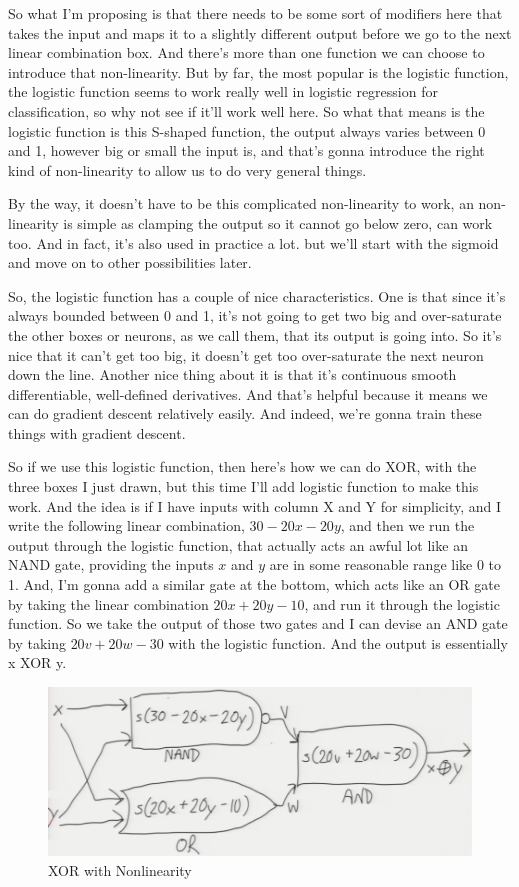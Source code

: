 \documentclass[fleqn,10pt]{olplainarticle}
\theoremstyle{definition}
\theoremstyle{remark}
\begin{document}
So what I'm proposing is that there needs to be some sort of modifiers here that takes the input and maps it to a slightly different output before we go to the next linear combination box. And there's more than one function we can choose  to introduce that non-linearity. But by far, the most popular is the logistic function, the logistic function seems to work really well in logistic regression for classification, so why not see if it'll work well here. So what that means is the logistic function is this S-shaped function, the output always varies between 0 and 1, however big or small the input is, and that's gonna introduce the right kind of non-linearity to allow us to do very general things. 

By the way, it doesn't have to be this complicated non-linearity to work, an non-linearity is simple as clamping the output so it cannot go below zero, can work too. And in fact, it's also used in practice a lot. but we'll start with the sigmoid and move on to other possibilities later.

So, the logistic function has a couple of nice characteristics. One is that since it's always bounded between 0 and 1, it's not going to get two big and over-saturate the other boxes or neurons, as we call them, that its output is going into. So it's nice that it can't get too big, it doesn't get too over-saturate the next neuron down the line. Another nice thing about it is that it's continuous smooth differentiable, well-defined derivatives. And that's helpful because it means we can do gradient descent relatively easily. And indeed, we're gonna train these things with gradient descent. 

So if we use this logistic function, then here's how we can do XOR, with the three boxes I just drawn, but this time I'll add logistic function to make this work. And the idea is if I have inputs with column X and Y for simplicity, and I write the following linear combination, $30-20x-20y$, and then we run the output through the logistic function, that actually acts an awful lot like an NAND gate, providing the inputs $x$ and $y$ are in some reasonable range like 0 to 1. And, I'm gonna add a similar gate at the bottom, which acts like an OR gate by taking the linear combination $20x+20y-10$, and run it through the logistic function. So we take the output of those two gates and I can devise an AND gate by taking $20v+20w-30$ with the logistic function. And the output is essentially x XOR y. 
\begin{figure}[ht]
\centering
\includegraphics[width=0.75\linewidth]{images/linear_combo_boxes_nonlinear_xor}
\caption{XOR with Nonlinearity}
\label{fig:linear_combo_boxes_nonlinear_xor}
\end{figure}
\end{document}
